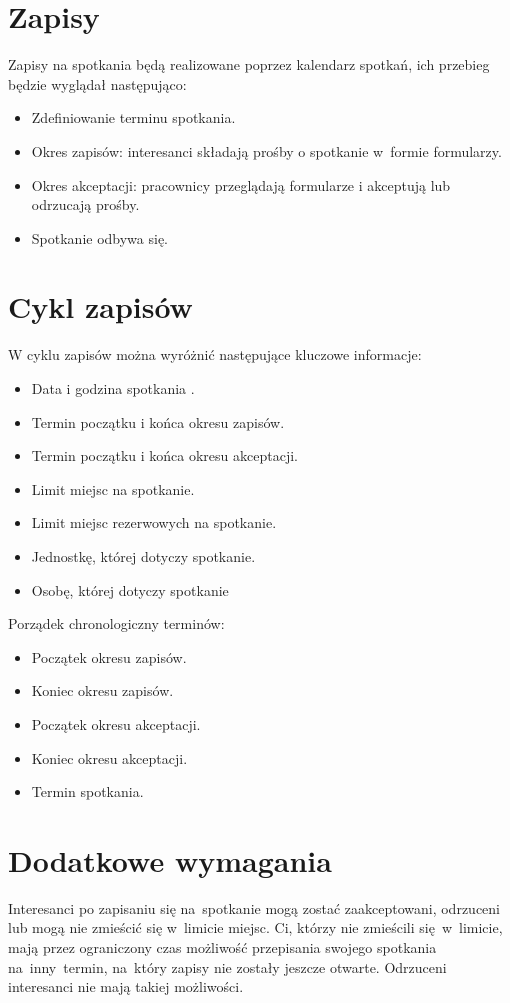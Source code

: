 \documentclass[licencjacka]{pracamgr}
\begin{document}
\section{Zapisy}
Zapisy na spotkania będą realizowane poprzez kalendarz spotkań, ich przebieg będzie wyglądał następująco:

\begin{itemize}
    \item Zdefiniowanie terminu spotkania.
    \item Okres zapisów: interesanci składają prośby o spotkanie w~formie formularzy.
    \item Okres akceptacji: pracownicy przeglądają formularze i akceptują lub odrzucają prośby.
    \item Spotkanie odbywa się.
\end{itemize}

\section{Cykl zapisów}
W cyklu zapisów można wyróżnić następujące kluczowe informacje:

\begin{itemize}
\setlength\itemsep{0,05em}
    \item Data i godzina spotkania .
    \item Termin początku i końca okresu zapisów.
    \item Termin początku i końca okresu akceptacji.
    \item Limit miejsc na spotkanie.
    \item Limit miejsc rezerwowych na spotkanie.
    \item Jednostkę, której dotyczy spotkanie.
    \item Osobę, której dotyczy spotkanie
\end{itemize}

Porządek chronologiczny terminów:

\begin{itemize}
\setlength\itemsep{0,05em}
    \item Początek okresu zapisów.
    \item Koniec okresu zapisów.
    \item Początek okresu akceptacji.
    \item Koniec okresu akceptacji.
    \item Termin spotkania.
\end{itemize}

\section{Dodatkowe wymagania}
Interesanci po zapisaniu się na~spotkanie mogą zostać zaakceptowani, odrzuceni lub mogą nie zmieścić się w~limicie miejsc. Ci, którzy nie zmieścili się~w~limicie, mają przez ograniczony czas możliwość przepisania swojego spotkania na~inny~termin, na~który zapisy nie zostały jeszcze otwarte. Odrzuceni interesanci nie mają takiej możliwości.
\end{document}
